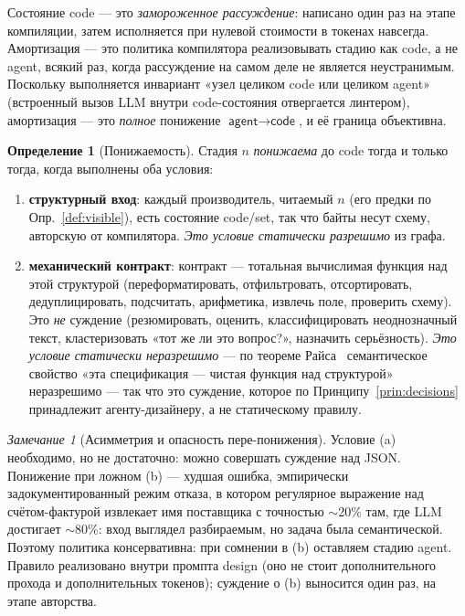 \documentclass[11pt]{article}
\theoremstyle{plain}
\theoremstyle{definition}
\newtheorem{definition}[theorem]{Определение}
\theoremstyle{remark}
\newtheorem{remark}[theorem]{Замечание}
\newcommand{\state}[1]{\textsf{#1}}
\begin{document}
Состояние \state{code} --- это \emph{замороженное рассуждение}: написано один раз на этапе
компиляции, затем исполняется при нулевой стоимости в токенах навсегда. Амортизация --- это
политика компилятора реализовывать стадию как \state{code}, а не \state{agent}, всякий раз,
когда рассуждение на самом деле не является неустранимым. Поскольку выполняется инвариант
«узел целиком \state{code} или целиком \state{agent}» (встроенный вызов LLM внутри
code-состояния отвергается линтером), амортизация --- это \emph{полное} понижение
$\state{agent} \to \state{code}$, и её граница объективна.

\begin{definition}[Понижаемость]\label{def:demote}
Стадия $n$ \emph{понижаема} до \state{code} тогда и только тогда, когда выполнены оба
условия:
\begin{enumerate}[label=(\alph*),nosep]
  \item \textbf{структурный вход}: каждый производитель, читаемый $n$ (его предки по
        Опр.~\ref{def:visible}), есть состояние \state{code}/\state{set}, так что байты
        несут схему, авторскую от компилятора. \emph{Это условие статически разрешимо} из
        графа.
  \item \textbf{механический контракт}: контракт --- тотальная вычислимая функция над этой
        структурой (переформатировать, отфильтровать, отсортировать, дедуплицировать,
        подсчитать, арифметика, извлечь поле, проверить схему). Это \emph{не} суждение
        (резюмировать, оценить, классифицировать неоднозначный текст, кластеризовать «тот
        же ли это вопрос?», назначить серьёзность). \emph{Это условие статически
        неразрешимо} --- по теореме Райса~\cite{rice} семантическое свойство «эта
        спецификация --- чистая функция над структурой» неразрешимо --- так что это
        суждение, которое по Принципу~\ref{prin:decisions} принадлежит агенту-дизайнеру, а
        не статическому правилу.
\end{enumerate}
\end{definition}

\begin{remark}[Асимметрия и опасность пере-понижения]
Условие (a) необходимо, но не достаточно: можно совершать суждение над JSON. Понижение при
ложном (b) --- худшая ошибка, эмпирически задокументированный режим отказа, в котором
регулярное выражение над счётом-фактурой извлекает имя поставщика с точностью $\sim$20\%
там, где LLM достигает $\sim$80\%: вход выглядел разбираемым, но задача была семантической.
Поэтому политика консервативна: при сомнении в (b) оставляем стадию \state{agent}. Правило
реализовано внутри промпта \state{design} (оно не стоит дополнительного прохода и
дополнительных токенов); суждение о (b) выносится один раз, на этапе авторства.
\end{remark}
\end{document}
